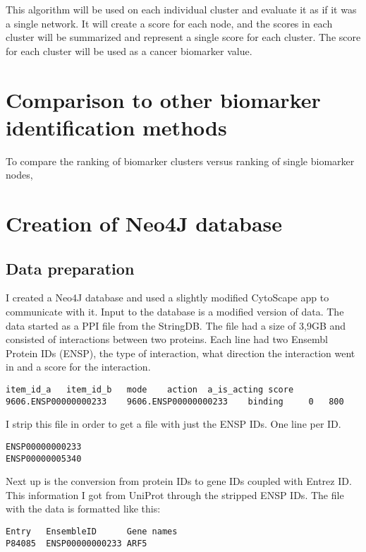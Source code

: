 This algorithm will be used on each individual cluster and evaluate it as if it
was a single network. It will create a score for each node, and the scores in
each cluster will be summarized and represent a single score for each cluster.
The score for each cluster will be used as a cancer biomarker value.

\chapter{Comparison to other biomarker identification methods}
To compare the ranking of biomarker clusters versus ranking of single biomarker
nodes, %

\chapter{Creation of Neo4J database} %
\section{Data preparation}
I created a Neo4J database and used a slightly modified CytoScape app to
communicate with it. Input to the database is a modified version of data. The
data started as a PPI file from the StringDB. The file had a size of 3,9GB and
consisted of interactions between two proteins. Each line had two Ensembl
Protein IDs (ENSP), the type of interaction, what direction the interaction went
in and a score for the interaction. 

\begin{verbatim}
item_id_a	item_id_b	mode	action	a_is_acting	score
9606.ENSP00000000233	9606.ENSP00000000233	binding		0	800
\end{verbatim}

I strip this file in order to get a file with just the ENSP IDs. One line per
ID.

\begin{verbatim}
ENSP00000000233
ENSP00000005340
\end{verbatim}

Next up is the conversion from protein IDs to gene IDs coupled with Entrez ID.
This information I got from UniProt through the stripped ENSP IDs. The file with
the data is formatted like this:

\begin{verbatim}
Entry	EnsembleID	    Gene names
P84085	ENSP00000000233	ARF5
\end{verbatim}

